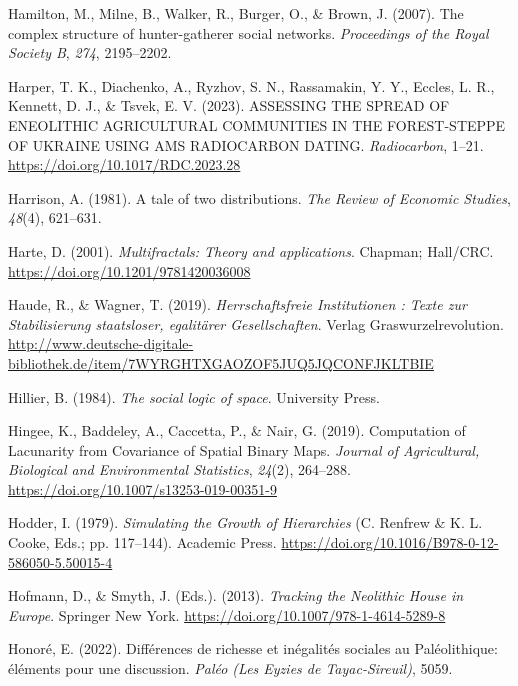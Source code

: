 \documentclass[
  12pt,
]{book}
\newlength{\cslhangindent}
\newlength{\cslentryspacingunit} %
\newenvironment{CSLReferences}[2] %
 {%
  \setlength{\parindent}{0pt}
  \ifodd #1
  \let\oldpar\par
  \def\par{\hangindent=\cslhangindent\oldpar}
  \fi
  \setlength{\parskip}{#2\cslentryspacingunit}
 }%
 {}
\begin{document}
\begin{CSLReferences}{1}{0}
\leavevmode{}%
Hamilton, M., Milne, B., Walker, R., Burger, O., \& Brown, J. (2007). The complex structure of hunter-gatherer social networks. \emph{Proceedings of the Royal Society B}, \emph{274}, 2195--2202.

\leavevmode{}%
Harper, T. K., Diachenko, A., Ryzhov, S. N., Rassamakin, Y. Y., Eccles, L. R., Kennett, D. J., \& Tsvek, E. V. (2023). ASSESSING THE SPREAD OF ENEOLITHIC AGRICULTURAL COMMUNITIES IN THE FOREST-STEPPE OF UKRAINE USING AMS RADIOCARBON DATING. \emph{Radiocarbon}, 1--21. \url{https://doi.org/10.1017/RDC.2023.28}

\leavevmode{}%
Harrison, A. (1981). A tale of two distributions. \emph{The Review of Economic Studies}, \emph{48}(4), 621--631.

\leavevmode{}%
Harte, D. (2001). \emph{Multifractals: Theory and applications}. Chapman; Hall/CRC. \url{https://doi.org/10.1201/9781420036008}

\leavevmode{}%
Haude, R., \& Wagner, T. (2019). \emph{Herrschaftsfreie Institutionen : Texte zur Stabilisierung staatsloser, egalitärer Gesellschaften}. Verlag Graswurzelrevolution. \url{http://www.deutsche-digitale-bibliothek.de/item/7WYRGHTXGAOZOF5JUQ5JQCONFJKLTBIE}

\leavevmode{}%
Hillier, B. (1984). \emph{The social logic of space}. University Press.

\leavevmode{}%
Hingee, K., Baddeley, A., Caccetta, P., \& Nair, G. (2019). Computation of Lacunarity from Covariance of Spatial Binary Maps. \emph{Journal of Agricultural, Biological and Environmental Statistics}, \emph{24}(2), 264--288. \url{https://doi.org/10.1007/s13253-019-00351-9}

\leavevmode{}%
Hodder, I. (1979). \emph{Simulating the Growth of Hierarchies} (C. Renfrew \& K. L. Cooke, Eds.; pp. 117--144). Academic Press. \url{https://doi.org/10.1016/B978-0-12-586050-5.50015-4}

\leavevmode{}%
Hofmann, D., \& Smyth, J. (Eds.). (2013). \emph{Tracking the Neolithic House in Europe}. Springer New York. \url{https://doi.org/10.1007/978-1-4614-5289-8}

\leavevmode{}%
Honoré, E. (2022). Différences de richesse et inégalités sociales au Paléolithique: éléments pour une discussion. \emph{Paléo (Les Eyzies de Tayac-Sireuil)}, 5059.


\end{CSLReferences}
\end{document}
